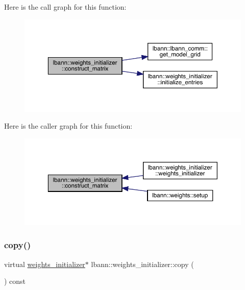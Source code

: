 Here is the call graph for this function\+:\nopagebreak
\begin{figure}[H]
\begin{center}
\leavevmode
\includegraphics[width=350pt]{classlbann_1_1weights__initializer_a693fd517e4162029eafdfdee537c7066_cgraph}
\end{center}
\end{figure}
Here is the caller graph for this function\+:\nopagebreak
\begin{figure}[H]
\begin{center}
\leavevmode
\includegraphics[width=350pt]{classlbann_1_1weights__initializer_a693fd517e4162029eafdfdee537c7066_icgraph}
\end{center}
\end{figure}
\mbox{\label{classlbann_1_1weights__initializer_acc84ce49188b74b23987cef3db18525a}} 
\subsubsection{\texorpdfstring{copy()}{copy()}}
{\footnotesize\ttfamily virtual \hyperlink{classlbann_1_1weights__initializer}{weights\+\_\+initializer}$\ast$ lbann\+::weights\+\_\+initializer\+::copy (\begin{DoxyParamCaption}{ }\end{DoxyParamCaption}) const\hspace{0.3cm}{\ttfamily [pure virtual]}}

